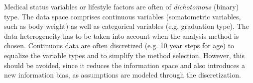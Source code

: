 \documentclass[journal]{style/vgtc} 			          %
\begin{document}
Medical status variables or lifestyle factors are often of \emph{dichotomous} (binary) type.
The data space comprises continuous variables (somatometric variables, such as body weight) as well as categorical variables (e.g. graduation type).
The data heterogeneity has to be taken into account when the analysis method is chosen.
Continuous data are often discretized (e.g. 10 year steps for age) to equalize the variable types and to simplify the method selection.
However, this should be avoided, since it reduces the information space and also introduces a new information bias, as assumptions are modeled through the discretization.
\end{document}

